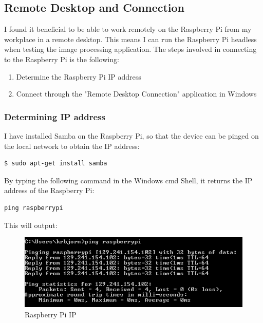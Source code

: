 \subsection{Remote Desktop and Connection}
I found it beneficial to be able to work remotely on the Raspberry Pi from my workplace in a remote desktop. This means I can run the Raspberry Pi headless when testing the image processing application. The steps involved in connecting to the Raspberry Pi is the following:
\begin{enumerate}
\item Determine the Raspberry Pi IP address
\item Connect through the "Remote Desktop Connection" application in Windows
\end{enumerate}

\subsubsection{Determining IP address}
I have installed Samba on the Raspberry Pi, so that the device can be pinged on the local network to obtain the IP address:
\begin{verbatim}
$ sudo apt-get install samba
\end{verbatim}
By typing the following command in the Windows cmd Shell, it returns the IP address of the Raspberry Pi:
\begin{verbatim}
ping raspberrypi
\end{verbatim}
This will output:
\begin{figure}[H]
  \centering
  \includegraphics[width=1\textwidth]{fig/ping}
  \caption{Raspberry Pi IP}
  \label{fig:ping}
\end{figure}

